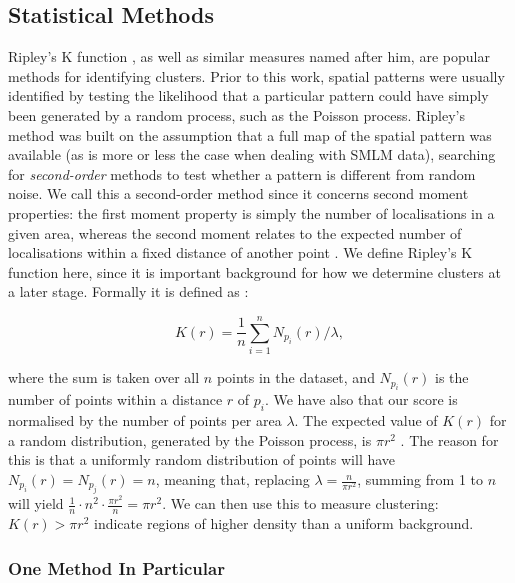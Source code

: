 \documentclass[11pt]{article}
\begin{document}
\subsection{Statistical Methods} \label{statisticalMethods}

Ripley's K function \cite{ripley1977modelling}, as well as similar measures named after him, are popular methods for identifying clusters. Prior to this work, spatial patterns were usually identified by testing the likelihood that a particular pattern could have simply been generated by a random process, such as the Poisson process. Ripley's method was built on the assumption that a full map of the spatial pattern was available (as is more or less the case when dealing with SMLM data), searching for \textit{second-order} methods to test whether a pattern is different from random noise. We call this a second-order method since it concerns second moment properties: the first moment property is simply the number of localisations in a given area, whereas the second moment relates to the expected number of localisations within a fixed distance of another point \cite{kiskowski2009use, Khater2020}. We define Ripley's K function here, since it is important background for how we determine clusters at a later stage. Formally it is defined as \cite{ripley1977modelling, kiskowski2009use}:

\begin{equation*}
	K(r) = \frac{1}{n} \sum_{i = 1}^{n} N_{p_i}(r) / \lambda,
\end{equation*}

where the sum is taken over all $n$ points in the dataset, and $N_{p_i}(r)$ is the number of points within a distance $r$ of $p_i$. We have also that our score is normalised by the number of points per area $\lambda$. The expected value of $K(r)$ for a random distribution, generated by the Poisson process, is $\pi r^2$ \cite{kiskowski2009use}. The reason for this is that a uniformly random distribution of points will have $N_{p_i}(r) = N_{p_j}(r) = n$, meaning that, replacing $\lambda = \frac{n}{\pi r^2}$, summing from 1 to $n$ will yield $\frac{1}{n} \cdot n^2 \cdot \frac{\pi r^2}{n} = \pi r^2$. We can then use this to measure clustering: $K(r) > \pi r^2$ indicate regions of higher density than a uniform background.\\

\subsubsection{One Method In Particular} \label{GandFdiscussion}
\end{document}

